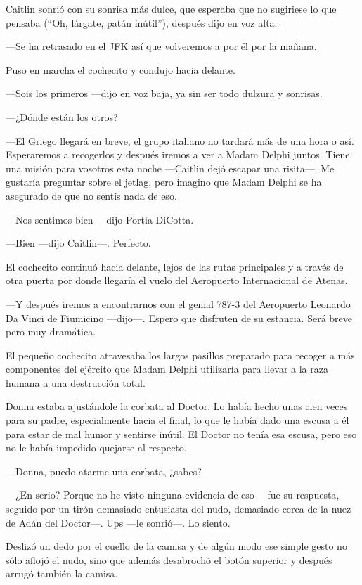 Caitlin sonrió con su sonrisa más dulce, que esperaba que no sugiriese
lo que pensaba (``Oh, lárgate, patán inútil''), después dijo en voz
alta.

---Se ha retrasado en el JFK así que volveremos a por él por la mañana.

Puso en marcha el cochecito y condujo hacia delante.

---Sois los primeros ---dijo en voz baja, ya sin ser todo dulzura y
sonrisas.

---¿Dónde están los otros?

---El Griego llegará en breve, el grupo italiano no tardará más de una
hora o así. Esperaremos a recogerlos y después iremos a ver a Madam
Delphi juntos. Tiene una misión para vosotros esta noche ---Caitlin dejó
escapar una risita---. Me gustaría preguntar sobre el jetlag, pero
imagino que Madam Delphi se ha asegurado de que no sentís nada de eso.

---Nos sentimos bien ---dijo Portia DiCotta.

---Bien ---dijo Caitlin---. Perfecto.

El cochecito continuó hacia delante, lejos de las rutas principales y a
través de otra puerta por donde llegaría el vuelo del Aeropuerto
Internacional de Atenas.

---Y después iremos a encontrarnos con el genial 787-3 del Aeropuerto
Leonardo Da Vinci de Fiumicino ---dijo---. Espero que disfruten de su
estancia. Será breve pero muy dramática.

El pequeño cochecito atravesaba los largos pasillos preparado para
recoger a más componentes del ejército que Madam Delphi utilizaría para
llevar a la raza humana a una destrucción total.

Donna estaba ajustándole la corbata al Doctor. Lo había hecho unas cien
veces para su padre, especialmente hacia el final, lo que le había dado
una escusa a él para estar de mal humor y sentirse inútil. El Doctor no
tenía esa escusa, pero eso no le había impedido quejarse al respecto.

---Donna, puedo atarme una corbata, ¿sabes?

---¿En serio? Porque no he visto ninguna evidencia de eso ---fue su
respuesta, seguido por un tirón demasiado entusiasta del nudo, demasiado
cerca de la nuez de Adán del Doctor---. Ups ---le sonrió---. Lo siento.

Deslizó un dedo por el cuello de la camisa y de algún modo ese simple
gesto no sólo aflojó el nudo, sino que además desabrochó el botón
superior y después arrugó también la camisa.

